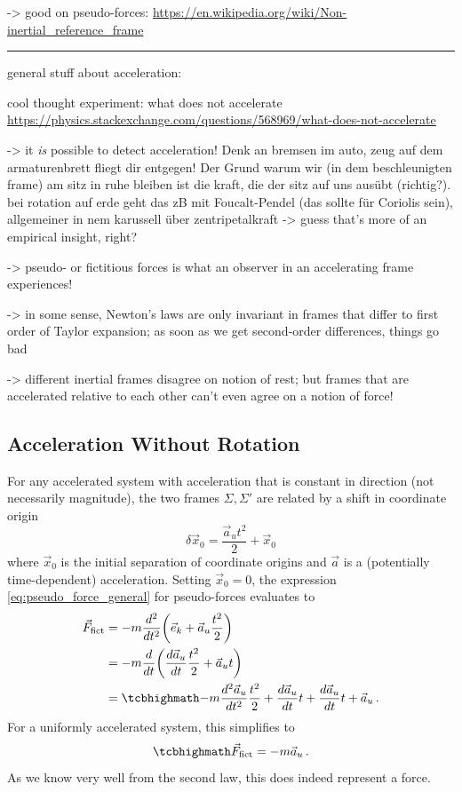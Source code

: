 \documentclass[../class_mech_main.tex]{subfiles}
\begin{document}
-> good on pseudo-forces: \url{https://en.wikipedia.org/wiki/Non-inertial_reference_frame}


\hrule

general stuff about acceleration:

cool thought experiment: what does not accelerate \url{https://physics.stackexchange.com/questions/568969/what-does-not-accelerate}


-> it \emph{is} possible to detect acceleration! Denk an bremsen im auto, zeug auf dem armaturenbrett fliegt dir entgegen! Der Grund warum wir (in dem beschleunigten frame) am sitz in ruhe bleiben ist die kraft, die der sitz auf uns ausübt (richtig?). bei rotation auf erde geht das zB mit Foucalt-Pendel (das sollte für Coriolis sein), allgemeiner in nem karussell über zentripetalkraft -> guess that's more of an empirical insight, right?


-> pseudo- or fictitious forces is what an observer in an accelerating frame experiences!


-> in some sense, Newton's laws are only invariant in frames that differ to first order of Taylor expansion; as soon as we get second-order differences, things go bad

-> different inertial frames disagree on notion of rest; but frames that are accelerated relative to each other can't even agree on a notion of force!





		\subsection{Acceleration Without Rotation}
For any accelerated system with acceleration that is constant in direction (not necessarily magnitude), the two frames $\Sigma, \Sigma'$ are related by a shift in coordinate origin
\begin{equation}
	\delta \vec{x}_0 = \frac{\vec{a}_u t^2}{2} + \vec{x}_0
\end{equation}
where $\vec{x}_0$ is the initial separation of coordinate origins and $\vec{a}$ is a (potentially time-dependent) acceleration. Setting $\vec{x}_0 = 0$, the expression \eqref{eq:pseudo_force_general} for pseudo-forces evaluates to
\begin{align}
	\vec{F}_\mathrm{fict}&= - m \dv[2]{t} \qty(\vec{e}_k + \vec{a}_u \frac{t^2}{2})
	\notag\\
	&= - m \dv{t} \qty(\dv{\vec{a}_u}{t} \frac{t^2}{2} + \vec{a}_u t)
	\notag\\
	&= \eqbox{
		- m \dv[2]{\vec{a}_u}{t} \frac{t^2}{2} + \dv{\vec{a}_u}{t} t + \dv{\vec{a}_u}{t} t + \vec{a}_u
	}
	\, .
\end{align}
For a uniformly accelerated system, this simplifies to
\begin{equation}
	\eqbox{
		\vec{F}_\mathrm{fict} = - m \vec{a}_u
	} \, .
\end{equation}
As we know very well from the second law, this does indeed represent a force.
\end{document}
